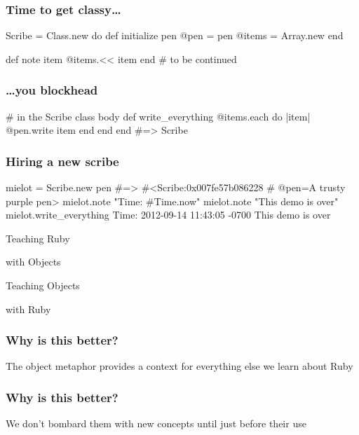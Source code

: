 \documentclass[20pt]{beamer}
\begin{document}
\begin{frame}[fragile]
\frametitle{Time to get classy\ldots}
\begin{rubycode}
Scribe = Class.new do
  def initialize pen
    @pen = pen
    @items = Array.new
  end

  def note item
    @items.<< item
  end
  # to be continued
\end{rubycode}
\end{frame}

\begin{frame}[fragile]
\frametitle{\ldots{}you blockhead}
\begin{rubycode}
  # in the Scribe class body
  def write_everything
    @items.each do |item|
      @pen.write item
    end
  end
end
#=> Scribe
\end{rubycode}
\end{frame}

\begin{frame}[fragile]
\frametitle{Hiring a new scribe}
\begin{rubycode}
mielot = Scribe.new pen
#=> #<Scribe:0x007fe57b086228
#   @pen=A trusty purple pen>
mielot.note "Time: #{Time.now}"
mielot.note "This demo is over"
mielot.write_everything
Time: 2012-09-14 11:43:05 -0700
This demo is over
\end{rubycode}
\end{frame}

{
\begin{frame}
\par { Teaching Ruby}\par
\vspace{3cm}\hfill
{with Objects}
\end{frame}

\begin{frame}
\par { Teaching Objects}\par
\vspace{3cm}\hfill
{with Ruby}
\end{frame}
}

\begin{frame}
\frametitle{Why is this better?}
The object metaphor provides a context for everything else we learn
about Ruby
\end{frame}

\begin{frame}
\frametitle{Why is this better?}
We don't bombard them with new concepts until just before their use
\end{frame}
\end{document}
